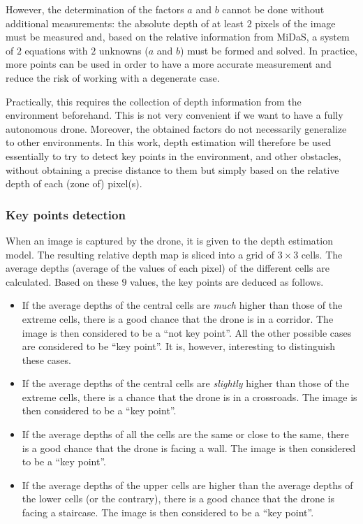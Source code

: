 However, the determination of the factors $a$ and $b$ cannot be done without additional measurements: the absolute depth of at least $2$ pixels of the image must be measured and, based on the relative information from MiDaS, a system of $2$ equations with $2$ unknowns ($a$ and $b$) must be formed and solved. In practice, more points can be used in order to have a more accurate measurement and reduce the risk of working with a degenerate case.

Practically, this requires the collection of depth information from the environment beforehand. This is not very convenient if we want to have a fully autonomous drone. Moreover, the obtained factors do not necessarily generalize to other environments. In this work, depth estimation will therefore be used essentially to try to detect key points in the environment, and other obstacles, without obtaining a precise distance to them but simply based on the relative depth of each (zone of) pixel(s).

\subsubsection{Key points detection}

When an image is captured by the drone, it is given to the depth estimation model. The resulting relative depth map is sliced into a grid of $3 \times 3$ cells. The average depths (average of the values of each pixel) of the different cells are calculated. Based on these $9$ values, the key points are deduced as follows.

\begin{itemize}
    \item If the average depths of the central cells are \emph{much} higher than those of the extreme cells, there is a good chance that the drone is in a corridor. The image is then considered to be a \enquote{not key point}. All the other possible cases are considered to be \enquote{key point}. It is, however, interesting to distinguish these cases.
    \item If the average depths of the central cells are \emph{slightly} higher than those of the extreme cells, there is a chance that the drone is in a crossroads. The image is then considered to be a \enquote{key point}.
    \item If the average depths of all the cells are the same or close to the same, there is a good chance that the drone is facing a wall. The image is then considered to be a \enquote{key point}.
    \item If the average depths of the upper cells are higher than the average depths of the lower cells (or the contrary), there is a good chance that the drone is facing a staircase. The image is then considered to be a \enquote{key point}.
\end{itemize}

